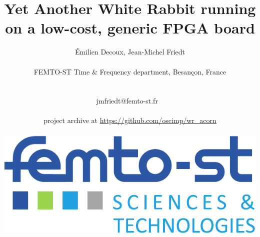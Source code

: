 \documentclass[compress,10pt,aspectratio=169]{beamer}
\begin{document}
\title{Yet Another White Rabbit running on a low-cost, generic FPGA board}
\author{\'Emilien Decoux, Jean-Michel Friedt\\ \ \\ 
FEMTO-ST Time \& Frequency department, Besan\c con, France \\ \ 
\\ \ \\ jmfriedt@femto-st.fr \ \\ \ \\
project archive at \url{https://github.com/oscimp/wr_acorn}\\
\parbox{1.0\linewidth}{\includegraphics[width=.3\linewidth]{logo_femto.pdf}\hfill
}\vspace{-1cm}  
}
\maketitle
\end{document}

